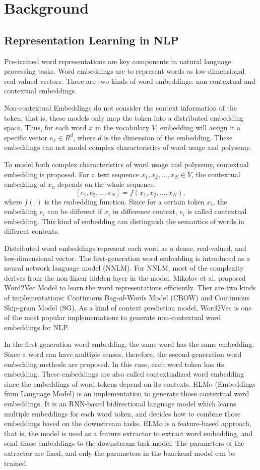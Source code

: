 \documentclass[conference]{IEEEtran}
\begin{document}
\section{Background}
\subsection{Representation Learning in NLP}
Pre-trained word representations are key components in natural language processing tasks. Word embeddings are to represent words as low-dimensional real-valued vectors.
There are two kinds of word embeddings: non-contextual and contextual embeddings.

Non-contextual Embeddings do not consider the context information of the token; that is, these models only map the token into a distributed embedding space.
Thus, for each word $x$ in the vocabulary $V$, embedding will assign it a specific vector $e_x \in R^d$, where $d$ is the dimension of the embedding.
These embeddings can not model complex characteristics of word usage and polysemy.

To model both complex characteristics of word usage and polysemy, contextual embedding is proposed.
For a text sequence $x_1, x_2, \ldots, x_N \in V$, the contextual embedding of $x_n$ depends on the whole sequence.
    \[[e_1, e_2, \ldots, e_N] = f(x_1, x_2, \ldots, x_N),\]
where $f(\cdot)$ is the embedding function. Since for a certain token $x_i$, the embedding $e_i$ can be different if $x_i$ in difference context,
$e_i$ is called contextual embedding. This kind of embedding can distinguish the semantics of words in different contexts.

Distributed word embeddings represent each word as a dense, real-valued, and low-dimensional vector. 
The first-generation word embedding is introduced as a neural network language model (NNLM).
For NNLM, most of the complexity derives from the non-linear hidden layer in the model.
Mikolov et al. proposed Word2Vec Model to learn the word representations efficiently.
Ther are two kinds of implementations: Continuous Bag-of-Words Model (CBOW) and Continuous Skip-gram Model (SG).
As a kind of context prediction model, Word2Vec is one of the most popular implementations to generate non-contextual word embeddings for NLP.

In the first-generation word embedding, the same word has the same embedding. Since a word can have multiple senses, therefore, the second-generation word embedding methods are proposed.
In this case, each word token has its embedding.
These embeddings are also called contextualized word embedding since the embeddings of word tokens depend on its contexts.
ELMo (Embeddings from Language Model) is an implementation to generate those contextual word embeddings.
It is an RNN-based bidirectional language model which learns multiple embeddings for each word token, and decides how to combine those embeddings based on the downstream tasks.
ELMo is a feature-based approach, that is, the model is used as a feature extractor to extract word embedding, and send those embeddings to the downstream task model.
The parameters of the extractor are fixed, and only the parameters in the baackend model can be trained.
\end{document}
